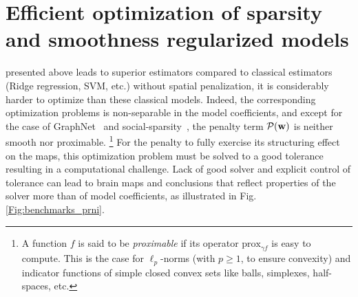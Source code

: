 \chapter{Efficient optimization of sparsity and smoothness regularized models}\label{chap:efficient_opt}

\minitoc

 presented above leads to superior estimators compared to classical estimators (Ridge regression, SVM, etc.) without spatial penalization, it is considerably harder to optimize than these classical models. Indeed, the corresponding optimization problems is non-separable in the model coefficients, and except for the case of GraphNet~\citep{hebiri2011,grosenick2013} and social-sparsity~\citep{kowalski2013social,varoquaux2016social},
the penalty term $\mathcal P(\mathbf{w})$ is neither smooth nor proximable.
\footnote{ A function $f$ is said to be \textit{proximable} if its operator $\text{prox}_{\gamma f}$ is easy to compute. This is the case for $\ell_p$-norms  (with $ p \ge 1$, to ensure convexity) and indicator functions of simple closed convex sets like balls, simplexes, half-spaces, etc.}
For the penalty to fully exercise its
structuring effect on the maps, this optimization problem must be
solved to a good tolerance resulting in a computational challenge. Lack of good solver and explicit control of
tolerance can lead to brain maps and conclusions that reflect
properties of the solver more than of model coefficients, as illustrated in Fig. \ref{Fig:benchmarks_prni}.

  

